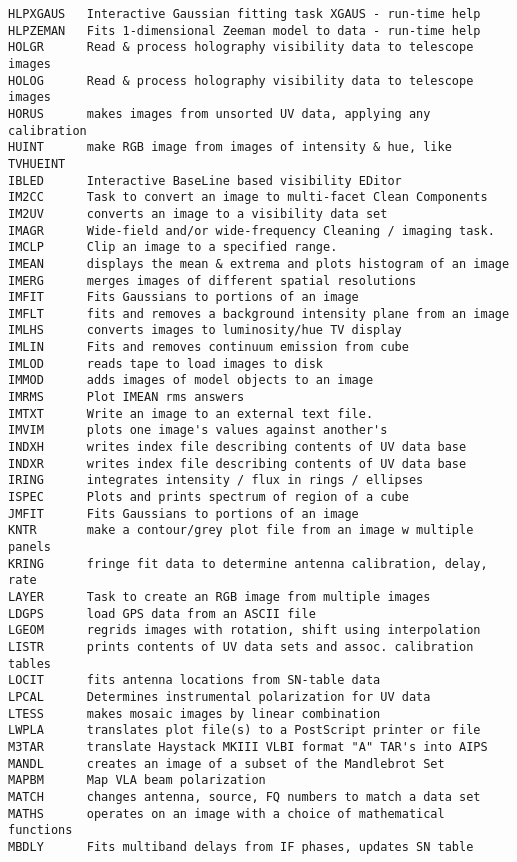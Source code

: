 \begin{verbatim}
HLPXGAUS   Interactive Gaussian fitting task XGAUS - run-time help
HLPZEMAN   Fits 1-dimensional Zeeman model to data - run-time help
HOLGR      Read & process holography visibility data to telescope images
HOLOG      Read & process holography visibility data to telescope images
HORUS      makes images from unsorted UV data, applying any calibration
HUINT      make RGB image from images of intensity & hue, like TVHUEINT
IBLED      Interactive BaseLine based visibility EDitor
IM2CC      Task to convert an image to multi-facet Clean Components
IM2UV      converts an image to a visibility data set
IMAGR      Wide-field and/or wide-frequency Cleaning / imaging task.
IMCLP      Clip an image to a specified range.
IMEAN      displays the mean & extrema and plots histogram of an image
IMERG      merges images of different spatial resolutions
IMFIT      Fits Gaussians to portions of an image
IMFLT      fits and removes a background intensity plane from an image
IMLHS      converts images to luminosity/hue TV display
IMLIN      Fits and removes continuum emission from cube
IMLOD      reads tape to load images to disk
IMMOD      adds images of model objects to an image
IMRMS      Plot IMEAN rms answers
IMTXT      Write an image to an external text file.
IMVIM      plots one image's values against another's
INDXH      writes index file describing contents of UV data base
INDXR      writes index file describing contents of UV data base
IRING      integrates intensity / flux in rings / ellipses
ISPEC      Plots and prints spectrum of region of a cube
JMFIT      Fits Gaussians to portions of an image
KNTR       make a contour/grey plot file from an image w multiple panels
KRING      fringe fit data to determine antenna calibration, delay, rate
LAYER      Task to create an RGB image from multiple images
LDGPS      load GPS data from an ASCII file
LGEOM      regrids images with rotation, shift using interpolation
LISTR      prints contents of UV data sets and assoc. calibration tables
LOCIT      fits antenna locations from SN-table data
LPCAL      Determines instrumental polarization for UV data
LTESS      makes mosaic images by linear combination
LWPLA      translates plot file(s) to a PostScript printer or file
M3TAR      translate Haystack MKIII VLBI format "A" TAR's into AIPS
MANDL      creates an image of a subset of the Mandlebrot Set
MAPBM      Map VLA beam polarization
MATCH      changes antenna, source, FQ numbers to match a data set
MATHS      operates on an image with a choice of mathematical functions
MBDLY      Fits multiband delays from IF phases, updates SN table

\end{verbatim}
